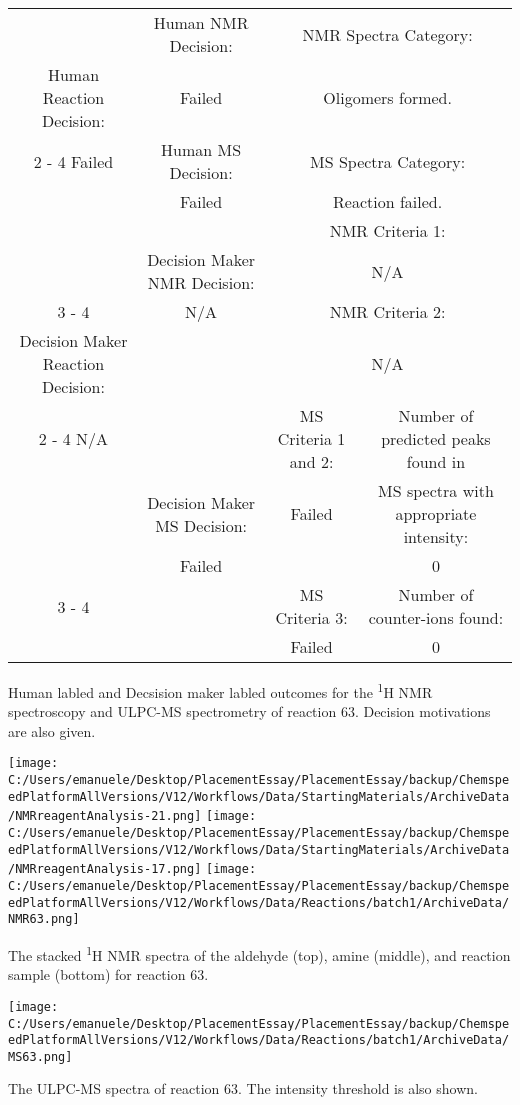 \documentclass{article}%
\begin{document}
\begin{Decision Table}[H]%
\begin{tabular}{|c|c|c|c|}%
\hline%
&Human NMR Decision:&\multicolumn{2}{|c|}{NMR Spectra Category:}\\%
Human Reaction Decision:&Failed&\multicolumn{2}{|c|}{Oligomers formed.}\\%
\cline{2%
-%
4}%
Failed&Human MS Decision:&\multicolumn{2}{|c|}{MS Spectra Category:}\\%
&Failed&\multicolumn{2}{|c|}{Reaction failed.}\\%
\hline%
&&\multicolumn{2}{|c|}{NMR Criteria 1:}\\%
&Decision Maker NMR Decision:&\multicolumn{2}{|c|}{N/A}\\%
\cline{3%
-%
4}%
&N/A&\multicolumn{2}{|c|}{NMR Criteria 2:}\\%
Decision Maker Reaction Decision:&&\multicolumn{2}{|c|}{N/A}\\%
\cline{2%
-%
4}%
N/A&&MS Criteria 1 and 2:&Number of predicted peaks found in\\%
&Decision Maker MS Decision:&Failed&MS spectra with appropriate intensity:\\%
&Failed&&0\\%
\cline{3%
-%
4}%
&&MS Criteria 3:&Number of counter{-}ions found:\\%
&&Failed&0\\%
\hline%
\end{tabular}%
\caption{Human labled and Decsision maker labled outcomes for the \textsuperscript{1}H NMR spectroscopy and ULPC-MS spectrometry of reaction 63. Decision motivations are also given.}%
\end{Decision Table}%
\begin{NMR Spectra}[H]%
\begin{center}%
\texttt{[image: C:/Users/emanuele/Desktop/PlacementEssay/PlacementEssay/backup/ChemspeedPlatformAllVersions/V12/Workflows/Data/StartingMaterials/ArchiveData/NMRreagentAnalysis-21.png]}\hfill%
\texttt{[image: C:/Users/emanuele/Desktop/PlacementEssay/PlacementEssay/backup/ChemspeedPlatformAllVersions/V12/Workflows/Data/StartingMaterials/ArchiveData/NMRreagentAnalysis-17.png]}\hfill%
\texttt{[image: C:/Users/emanuele/Desktop/PlacementEssay/PlacementEssay/backup/ChemspeedPlatformAllVersions/V12/Workflows/Data/Reactions/batch1/ArchiveData/NMR63.png]}\hfill%
\end{center}%
\caption{The stacked \textsuperscript{1}H NMR spectra of the aldehyde (top), amine (middle), and reaction sample (bottom) for reaction 63.}%
\end{NMR Spectra}%
\begin{MS Spectra}[H]%
\begin{center}%
\texttt{[image: C:/Users/emanuele/Desktop/PlacementEssay/PlacementEssay/backup/ChemspeedPlatformAllVersions/V12/Workflows/Data/Reactions/batch1/ArchiveData/MS63.png]}\hfill%
\end{center}%
\caption{The ULPC-MS spectra of reaction 63. The intensity threshold is also shown.}%
\end{MS Spectra}%
\end{document}
